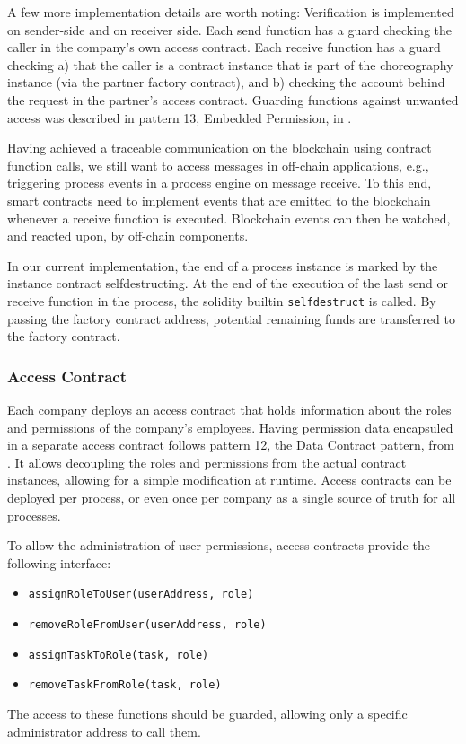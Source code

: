 \documentclass[runningheads]{llncs}
\begin{document}
A few more implementation details are worth noting:
Verification is implemented on sender-side and on receiver side.
Each send function has a guard checking the caller in the company's own access contract.
Each receive function has a guard checking a) that the caller is a contract instance that is part of the choreography instance (via the partner factory contract), and b) checking the account behind the request in the partner's access contract.
Guarding functions against unwanted access was described in pattern 13, Embedded Permission, in \cite{xu2018pattern}.

Having achieved a traceable communication on the blockchain using contract function calls, we still want to access messages in off-chain applications, e.g., triggering process events in a process engine on message receive.
To this end, smart contracts need to implement events that are emitted to the blockchain whenever a receive function is executed.
Blockchain events can then be watched, and reacted upon, by off-chain components.

In our current implementation, the end of a process instance is marked by the instance contract selfdestructing.
At the end of the execution of the last send or receive function in the process, the solidity builtin \texttt{selfdestruct} is called.
By passing the factory contract address, potential remaining funds are transferred to the factory contract.

\subsubsection{Access Contract}

Each company deploys an access contract that holds information about the roles and permissions of the company's employees.
Having permission data encapsuled in a separate access contract follows pattern 12, the Data Contract pattern, from \cite{xu2018pattern}.
It allows decoupling the roles and permissions from the actual contract instances, allowing for a simple modification at runtime.
Access contracts can be deployed per process, or even once per company as a single source of truth for all processes.

To allow the administration of user permissions, access contracts provide the following interface:
\begin{itemize}
	\item \texttt{assignRoleToUser(userAddress, role)}
	\item \texttt{removeRoleFromUser(userAddress, role)}
	\item \texttt{assignTaskToRole(task, role)}
	\item \texttt{removeTaskFromRole(task, role)}
\end{itemize}
The access to these functions should be guarded, allowing only a specific administrator address to call them.
\end{document}
